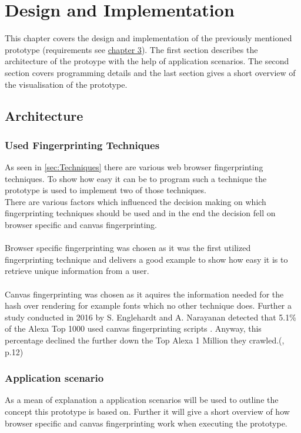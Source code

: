 
\chapter{Design and Implementation}
\label{cha:implementation}

This chapter covers the design and implementation of the previously mentioned prototype (requirements see \hyperref[cha:requirements]{chapter 3}). The first section describes the architecture of the protoype with the help of application scenarios. The second section covers programming details and the last section gives a short overview of the visualisation of the prototype.

\section{Architecture}

\subsection{Used Fingerprinting Techniques}
As seen in \autoref{sec:Techniques} there are various web browser fingerprinting techniques. To show how easy it can be to program such a technique the prototype is used to implement two of those techniques.\\ 
There are various factors which influenced the decision making on which fingerprinting techniques should be used and in the end the decision fell on browser specific and canvas fingerprinting.\\\\
Browser specific fingerprinting was chosen as it was the first utilized fingerprinting technique and delivers a good example to show how easy it is to retrieve unique information from a user.\\\\
Canvas fingerprinting was chosen as it aquires the information needed for the hash over rendering for example fonts which no other technique does. Further a study conducted in 2016 by S. Englehardt and A. Narayanan detected that 5.1\% of the Alexa Top 1000 used canvas fingerprinting scripts . Anyway, this percentage declined the further down the Top Alexa 1 Million they crawled.(\textcite{engl16}, p.12)\\


\subsection{Application scenario}
As a mean of explanation a application scenarios will be used to outline the concept this prototype is based on. Further it will give a short overview of how browser specific and canvas fingerprinting work when executing the prototype.\\

